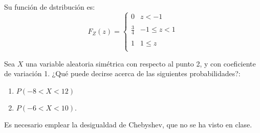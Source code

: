 \begin{ejercicio}
\begin{enumerate}
        Su función de dstribución es:
        \begin{equation*}
            F_Z(z)=\left\{\begin{array}{cc}
                0 & z<-1 \\ \\
                \displaystyle \frac{3}{4} & -1\leq z<1 \\ \\
                1 & 1 \leq z\\
            \end{array}\right.
        \end{equation*}
    \end{enumerate}
\end{ejercicio}


\begin{ejercicio}
    Sea $X$ una variable aleatoria simétrica con respecto al punto 2, y con coeficiente de variación 1. ¿Qué puede decirse acerca de las siguientes probabilidades?:
    \begin{enumerate}
        \item $P(-8 < X < 12)$
        \item $P(-6 < X < 10)$.
    \end{enumerate}

    Es necesario emplear la desigualdad de Chebyshev, que no se ha visto en clase.
\end{ejercicio}

